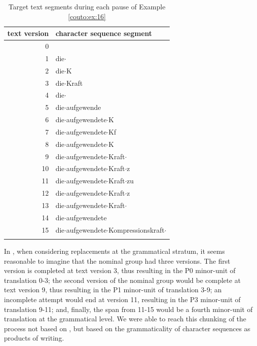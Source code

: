 \documentclass[output=paper]{LSP/langsci}
\begin{document}
\begin{table}[b] 
	\begin{tabularx}{\textwidth}{rl}
		\lsptoprule
		text version & character sequence segment \\
		\midrule
		0 & \\
		1 & die$\cdot$ \\
		2 & die$\cdot$K \\
		3 & die$\cdot$Kraft \\
		4 & die$\cdot$ \\
		5 & die$\cdot$aufgewende \\
		6 & die$\cdot$aufgewendete$\cdot$K \\
		7 & die$\cdot$aufgewendete$\cdot$Kf \\
		8 & die$\cdot$aufgewendete$\cdot$K \\
		9 & die$\cdot$aufgewendete$\cdot$Kraft$\cdot$ \\
		10 & die$\cdot$aufgewendete$\cdot$Kraft$\cdot$z \\
		11 & die$\cdot$aufgewendete$\cdot$Kraft$\cdot$zu \\
		12 & die$\cdot$aufgewendete$\cdot$Kraft$\cdot$z \\
		13 & die$\cdot$aufgewendete$\cdot$Kraft$\cdot$ \\
		14 & die$\cdot$aufgewendete \\
		15 & die$\cdot$aufgewendete$\cdot$Kompressionskraft$\cdot$ \\
		\lspbottomrule
	\end{tabularx}
	\caption{ Target text segments during each pause of Example \ref{couto:ex:16} }
	\label{couto:tab:5}
\end{table}

In , when considering replacements at the grammatical stratum, it seems reasonable to imagine that the nominal group had three versions. The first version is completed at text version 3, thus resulting in the P0 minor-unit of translation 0-3; the second version of the nominal group would be complete at text version 9, thus resulting in the P1 minor-unit of translation 3-9; an incomplete attempt would end at version 11, resulting in the P3 minor-unit of translation 9-11; and, finally, the span from 11-15 would be a fourth minor-unit of translation at the grammatical level. We were able to reach this chunking of the process not based on , but based on the grammaticality of character sequences as products of writing.
\end{document}
